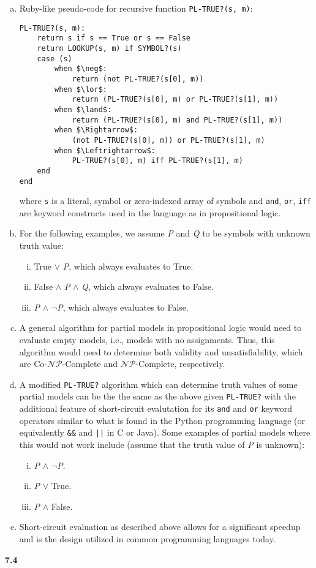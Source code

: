 \documentclass{scrartcl}
\begin{document}
\begin{enumerate}[(a)]
    \item Ruby-like pseudo-code for recursive function \verb|PL-TRUE?(s, m)|:
\begin{lstlisting}
PL-TRUE?(s, m):
    return s if s == True or s == False
    return LOOKUP(s, m) if SYMBOL?(s)
    case (s)
        when $\neg$:
            return (not PL-TRUE?(s[0], m))
        when $\lor$:
            return (PL-TRUE?(s[0], m) or PL-TRUE?(s[1], m))
        when $\land$:
            return (PL-TRUE?(s[0], m) and PL-TRUE?(s[1], m))
        when $\Rightarrow$:
            (not PL-TRUE?(s[0], m)) or PL-TRUE?(s[1], m)
        when $\Leftrightarrow$:
            PL-TRUE?(s[0], m) iff PL-TRUE?(s[1], m)
    end
end
\end{lstlisting}
        where \verb|s| is a literal, symbol or zero-indexed array of symbols and \verb|and|,
        \verb|or|, \verb|iff| are keyword constructs used in the language as in propositional logic.
    \item For the following examples, we assume \emph{P} and \emph{Q} to be symbols with unknown
        truth value:
        \begin{enumerate}[(i)]
            \item True $\lor$ \emph{P}, which always evaluates to True.
            \item False $\land$ \emph{P} $\land$ \emph{Q}, which always evaluates to False.
            \item \emph{P} $\land$ $\neg$\emph{P}, which always evaluates to False.
        \end{enumerate}
    \item A general algorithm for partial models in propositional logic would need to evaluate empty
        models, i.e., models with no assignments. Thus, this algorithm would need to determine both
        validity and unsatisfiability, which are Co-$\mathcal{NP}$-Complete and
        $\mathcal{NP}$-Complete, respectively.
    \item A modified \verb|PL-TRUE?| algorithm which can determine truth values of some partial
        models can be the the same as the above given \verb|PL-TRUE?| with the additional feature of
        short-circuit evalutation for its \verb|and| and \verb|or| keyword operators similar to what
        is found in the Python programming language (or equivalently \verb|&&| and \verb:||: in
        C or Java). Some examples of partial models where this would not work include (assume that
        the truth value of \emph{P} is unknown):
        \begin{enumerate}[(i)]
            \item \emph{P} $\land$ $\neg$\emph{P}.
            \item \emph{P} $\lor$ True.
            \item \emph{P} $\land$ False.
        \end{enumerate}
    \item Short-circuit evaluation as described above allows for a significant speedup and is the
        design utilized in common programming languages today.
\end{enumerate}
\textbf{7.4}
\end{document}
